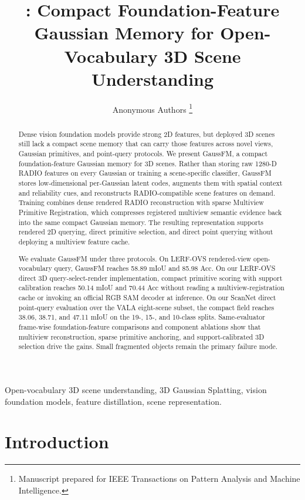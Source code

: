 \documentclass[journal,twoside]{IEEEtran}
\title{\method{}: Compact Foundation-Feature Gaussian Memory for Open-Vocabulary 3D Scene Understanding}
\author{Anonymous Authors%
\thanks{Manuscript prepared for IEEE Transactions on Pattern Analysis and Machine Intelligence.}}
\newcommand{\method}{GaussFM}
\begin{document}
\maketitle

\begin{abstract}
Dense vision foundation models provide strong 2D features, but deployed 3D
scenes still lack a compact scene memory that can carry those features across
novel views, Gaussian primitives, and point-query protocols. We present
\method{}, a compact foundation-feature Gaussian memory for 3D scenes. Rather
than storing raw 1280-D RADIO features on every Gaussian or training a
scene-specific classifier, \method{} stores low-dimensional per-Gaussian latent
codes, augments them with spatial context and reliability cues, and reconstructs
RADIO-compatible scene features on demand. Training combines dense rendered
RADIO reconstruction with sparse Multiview Primitive Registration, which
compresses registered multiview semantic evidence back into the same compact
Gaussian memory. The resulting representation supports rendered 2D querying,
direct primitive selection, and direct point querying without deploying a
multiview feature cache.

We evaluate \method{} under three protocols. On LERF-OVS rendered-view
open-vocabulary query, \method{} reaches 58.89 mIoU and 85.98 Acc. On our
LERF-OVS direct 3D query-select-render implementation, compact primitive scoring
with support calibration reaches 50.14 mIoU and 70.44 Acc without
reading a multiview-registration cache or invoking an official RGB SAM decoder
at inference. On our ScanNet direct point-query evaluation over the VALA
eight-scene subset, the compact field reaches 38.06, 38.71, and 47.11 mIoU on
the 19-, 15-, and 10-class splits. Same-evaluator frame-wise
foundation-feature comparisons
and component ablations show that multiview reconstruction, sparse primitive
anchoring, and support-calibrated 3D selection drive the gains. Small
fragmented objects remain the primary failure mode.
\end{abstract}

\begin{IEEEkeywords}
Open-vocabulary 3D scene understanding, 3D Gaussian Splatting, vision foundation models, feature distillation, scene representation.
\end{IEEEkeywords}

\section{Introduction}
\end{document}
